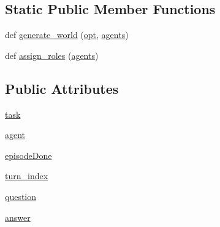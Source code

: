 \subsection*{Static Public Member Functions}
\begin{DoxyCompactItemize}
\item 
def \hyperlink{classparlai_1_1chat__service_1_1tasks_1_1qa__data__collection_1_1worlds_1_1QADataCollectionTaskWorld_a0c3ef21545611c4b2ada106aea5b3245}{generate\+\_\+world} (\hyperlink{classparlai_1_1core_1_1worlds_1_1World_a3640d92718acd3e6942a28c1ab3678bd}{opt}, \hyperlink{classparlai_1_1core_1_1worlds_1_1World_a728f75194cc26ea4035047c46cf62608}{agents})
\item 
def \hyperlink{classparlai_1_1chat__service_1_1tasks_1_1qa__data__collection_1_1worlds_1_1QADataCollectionTaskWorld_ad2cd59c59e84f1b504ee1df22f798d52}{assign\+\_\+roles} (\hyperlink{classparlai_1_1core_1_1worlds_1_1World_a728f75194cc26ea4035047c46cf62608}{agents})
\end{DoxyCompactItemize}
\subsection*{Public Attributes}
\begin{DoxyCompactItemize}
\item 
\hyperlink{classparlai_1_1chat__service_1_1tasks_1_1qa__data__collection_1_1worlds_1_1QADataCollectionTaskWorld_a2299f4d3d23e9d08be9430814aad9472}{task}
\item 
\hyperlink{classparlai_1_1chat__service_1_1tasks_1_1qa__data__collection_1_1worlds_1_1QADataCollectionTaskWorld_a2070bf88d1309e9f11d402ae58ae58cb}{agent}
\item 
\hyperlink{classparlai_1_1chat__service_1_1tasks_1_1qa__data__collection_1_1worlds_1_1QADataCollectionTaskWorld_a323d04b0bdfdc0a1a58208df89c7b4ee}{episode\+Done}
\item 
\hyperlink{classparlai_1_1chat__service_1_1tasks_1_1qa__data__collection_1_1worlds_1_1QADataCollectionTaskWorld_a473083662ee62a677abf655340ce9b91}{turn\+\_\+index}
\item 
\hyperlink{classparlai_1_1chat__service_1_1tasks_1_1qa__data__collection_1_1worlds_1_1QADataCollectionTaskWorld_a85bad2e20f92f09ab9c1fd3567ee320f}{question}
\item 
\hyperlink{classparlai_1_1chat__service_1_1tasks_1_1qa__data__collection_1_1worlds_1_1QADataCollectionTaskWorld_a8cc30f53f73fc8606dc311431e05008f}{answer}
\end{DoxyCompactItemize}
